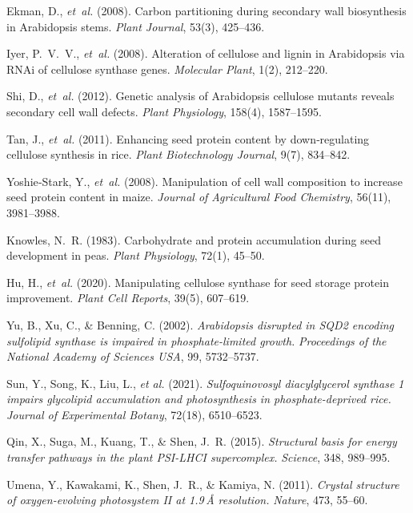 \documentclass[10pt,letterpaper]{article}
\begin{document}
\begin{thebibliography}{10}
Ekman, D., \emph{et~al.} (2008).  
Carbon partitioning during secondary wall biosynthesis in Arabidopsis stems.  
\emph{Plant Journal}, 53(3), 425–436.

Iyer, P.~V.~V., \emph{et~al.} (2008).  
Alteration of cellulose and lignin in Arabidopsis via RNAi of cellulose synthase genes.  
\emph{Molecular Plant}, 1(2), 212–220.

Shi, D., \emph{et~al.} (2012).  
Genetic analysis of Arabidopsis cellulose mutants reveals secondary cell wall defects.  
\emph{Plant Physiology}, 158(4), 1587–1595.

Tan, J., \emph{et~al.} (2011).  
Enhancing seed protein content by down‐regulating cellulose synthesis in rice.  
\emph{Plant Biotechnology Journal}, 9(7), 834–842.

Yoshie‐Stark, Y., \emph{et~al.} (2008).  
Manipulation of cell wall composition to increase seed protein content in maize.  
\emph{Journal of Agricultural Food Chemistry}, 56(11), 3981–3988.

Knowles, N.~R. (1983).  
Carbohydrate and protein accumulation during seed development in peas.  
\emph{Plant Physiology}, 72(1), 45–50.

Hu, H., \emph{et~al.} (2020).  
Manipulating cellulose synthase for seed storage protein improvement.  
\emph{Plant Cell Reports}, 39(5), 607–619.


Yu, B., Xu, C., \& Benning, C. (2002).  
\emph{Arabidopsis disrupted in SQD2 encoding sulfolipid synthase is impaired in phosphate-limited growth.}  
\textit{Proceedings of the National Academy of Sciences USA}, 99, 5732–5737.

Sun, Y., Song, K., Liu, L., \emph{et al.} (2021).  
\emph{Sulfoquinovosyl diacylglycerol synthase 1 impairs glycolipid accumulation and photosynthesis in phosphate-deprived rice.}  
\textit{Journal of Experimental Botany}, 72(18), 6510–6523.

Qin, X., Suga, M., Kuang, T., \& Shen, J. R. (2015).  
\emph{Structural basis for energy transfer pathways in the plant PSI-LHCI supercomplex.}  
\textit{Science}, 348, 989–995.

Umena, Y., Kawakami, K., Shen, J. R., \& Kamiya, N. (2011).  
\emph{Crystal structure of oxygen-evolving photosystem II at 1.9 Å resolution.}  
\textit{Nature}, 473, 55–60.


\end{thebibliography}
\end{document}
